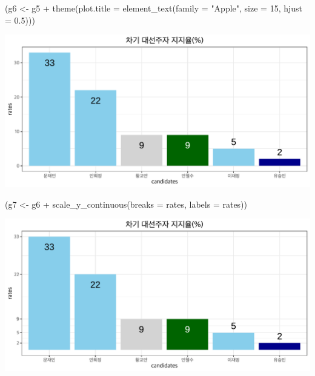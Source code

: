 \documentclass[
]{article}
\newenvironment{Shaded}{}{}
\newcommand{\AttributeTok}[1]{\textcolor[rgb]{0.49,0.56,0.16}{#1}}
\newcommand{\DecValTok}[1]{\textcolor[rgb]{0.25,0.63,0.44}{#1}}
\newcommand{\FloatTok}[1]{\textcolor[rgb]{0.25,0.63,0.44}{#1}}
\newcommand{\FunctionTok}[1]{\textcolor[rgb]{0.02,0.16,0.49}{#1}}
\newcommand{\NormalTok}[1]{#1}
\newcommand{\OtherTok}[1]{\textcolor[rgb]{0.00,0.44,0.13}{#1}}
\newcommand{\SpecialCharTok}[1]{\textcolor[rgb]{0.25,0.44,0.63}{#1}}
\newcommand{\StringTok}[1]{\textcolor[rgb]{0.25,0.44,0.63}{#1}}
\begin{document}
\begin{Shaded}
\begin{Highlighting}[]
\NormalTok{(g6 }\OtherTok{\textless{}{-}}\NormalTok{ g5 }\SpecialCharTok{+}
   \FunctionTok{theme}\NormalTok{(}\AttributeTok{plot.title =} \FunctionTok{element\_text}\NormalTok{(}\AttributeTok{family =} \StringTok{"Apple"}\NormalTok{,    }
                                  \AttributeTok{size =} \DecValTok{15}\NormalTok{, }
                                  \AttributeTok{hjust =} \FloatTok{0.5}\NormalTok{)))}
\end{Highlighting}
\end{Shaded}

\includegraphics{poll_JTBC_1702_pdf_files/figure-latex/unnamed-chunk-5-1.pdf}

\begin{Shaded}
\begin{Highlighting}[]
\NormalTok{(g7 }\OtherTok{\textless{}{-}}\NormalTok{ g6 }\SpecialCharTok{+}
  \FunctionTok{scale\_y\_continuous}\NormalTok{(}\AttributeTok{breaks =}\NormalTok{ rates, }\AttributeTok{labels =}\NormalTok{ rates))}
\end{Highlighting}
\end{Shaded}

\includegraphics{poll_JTBC_1702_pdf_files/figure-latex/unnamed-chunk-5-2.pdf}
\end{document}
